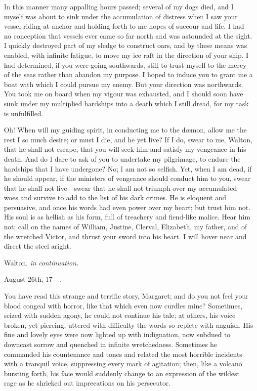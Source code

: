 \documentclass[12pt,openright]{book}
\begin{document}
In this manner many appalling hours passed; several of my dogs died, and I myself was about to sink under the accumulation of distress when I saw your vessel riding at anchor and holding forth to me hopes of succour and life. I had no conception that vessels ever came so far north and was astounded at the sight. I quickly destroyed part of my sledge to construct oars, and by these means was enabled, with infinite fatigue, to move my ice raft in the direction of your ship. I had determined, if you were going southwards, still to trust myself to the mercy of the seas rather than abandon my purpose. I hoped to induce you to grant me a boat with which I could pursue my enemy. But your direction was northwards. You took me on board when my vigour was exhausted, and I should soon have sunk under my multiplied hardships into a death which I still dread, for my task is unfulfilled.

Oh! When will my guiding spirit, in conducting me to the dæmon, allow me the rest I so much desire; or must I die, and he yet live? If I do, swear to me, Walton, that he shall not escape, that you will seek him and satisfy my vengeance in his death. And do I dare to ask of you to undertake my pilgrimage, to endure the hardships that I have undergone? No; I am not so selfish. Yet, when I am dead, if he should appear, if the ministers of vengeance should conduct him to you, swear that he shall not live—swear that he shall not triumph over my accumulated woes and survive to add to the list of his dark crimes. He is eloquent and persuasive, and once his words had even power over my heart; but trust him not. His soul is as hellish as his form, full of treachery and fiend-like malice. Hear him not; call on the names of William, Justine, Clerval, Elizabeth, my father, and of the wretched Victor, and thrust your sword into his heart. I will hover near and direct the steel aright.

Walton, \textit{in continuation.}

August 26th, 17—.

You have read this strange and terrific story, Margaret; and do you not feel your blood congeal with horror, like that which even now curdles mine? Sometimes, seized with sudden agony, he could not continue his tale; at others, his voice broken, yet piercing, uttered with difficulty the words so replete with anguish. His fine and lovely eyes were now lighted up with indignation, now subdued to downcast sorrow and quenched in infinite wretchedness. Sometimes he commanded his countenance and tones and related the most horrible incidents with a tranquil voice, suppressing every mark of agitation; then, like a volcano bursting forth, his face would suddenly change to an expression of the wildest rage as he shrieked out imprecations on his persecutor.
\end{document}
